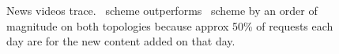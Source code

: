 \eat
{
\begin{figure}[t]	
\begin{center}
\end{center}
\vspace{-0.2in}
\caption{News videos trace. \invlru\ scheme  outperforms \optrp\ scheme by an order of magnitude on both topologies because approx 50\% of requests each day are for the new content added on that day.}
\label{fig:newsMLU}
\end{figure}

}
